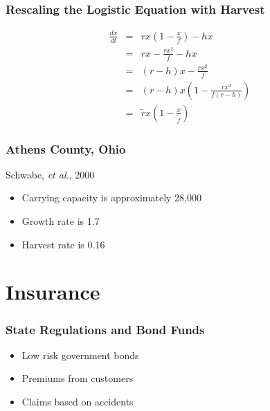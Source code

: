 \begin{frame}
    \frametitle{Rescaling the Logistic Equation with Harvest}
	\vspace{-1cm}
	\begin{eqnarray*}
		\frac{dx}{dt} &=& rx \left( 1-\frac{x}{f} \right) -hx\\
		 &=& rx-\frac{rx^{2}}{f}-hx\\
		 &=& (r-h)x-\frac{rx^{2}}{f}\\
		 &=& (r-h)x \left(1-\frac{rx^{2}}{f(r-h)} \right)\\
		 &=& \tilde{r}x \left( 1-\frac{x}{\tilde{f}} \right)		
	\end{eqnarray*}
\end{frame}

\begin{frame}
    \frametitle{Athens County, Ohio}
Schwabe, \emph{et al.}, 2000
	\begin{itemize}
		\item Carrying capacity is approximately 28,000
		\item Growth rate is 1.7
		\item Harvest rate is 0.16
	\end{itemize}
\end{frame}






\section{Insurance}

\begin{frame}
    \frametitle{State Regulations and Bond Funds}
	\begin{itemize}
		\item Low risk government bonds
		\item Premiums from customers
		\item Claims based on accidents
	\end{itemize}
\end{frame}